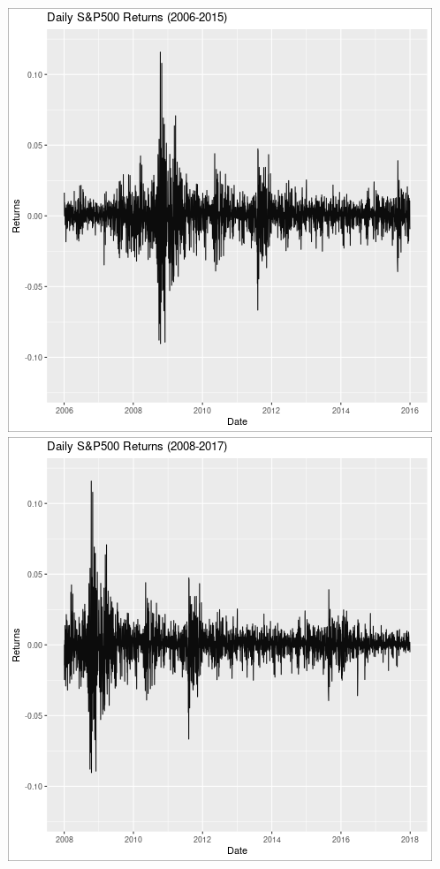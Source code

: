 \documentclass[12pt,letterpaper,reqno,fleqn]{article}
\begin{document}
\begin{figure}
\includegraphics[scale=.45]{plot0615}
\includegraphics[scale=.45]{plot0817}

\end{figure}
\end{document}
